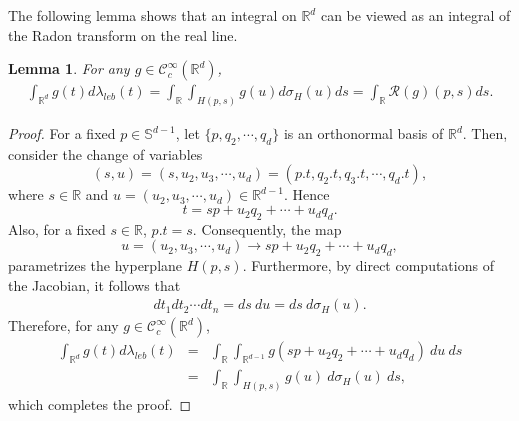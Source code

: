 \documentclass[11pt,reqno]{amsart}
\theoremstyle{plain}
\newtheorem{lemma}[theorem]{Lemma}
\theoremstyle{definition}
\numberwithin{equation}{section}
\newcommand{\R}{\mathbb{R}}
\newcommand{\beas}{\begin{eqnarray*}}
\newcommand{\eeas}{\end{eqnarray*}}
\begin{document}
     The following lemma shows that an integral on $\R^d$ can be viewed as an integral of the Radon transform on the real line.
	\begin{lemma}\label{le:COV}For any $g\in\mathcal C^\infty_c(\R^d)$,
		\beas\label{eq:cov cone}\nonumber
		\int_{\R^d} g(t) d\lambda_{leb}(t)= \int_\R \int_{H(p,s)} g(u) d\sigma_H(u) ds
		=\label{eq:cov cone} \int_\R \mathcal R (g)(p,s) ds.
		\eeas
	\end{lemma}
	\begin{proof}
		For a fixed $p\in\mathbb S^{d-1}$, let $\{p,q_2,\cdots,q_{d}\}$ is an orthonormal basis of $\R^d$. Then, consider the change of variables 
        \[
       (s,u)= (s,u_2,u_3,\cdots,u_{d})=( p.t,  q_2.t, q_3.t,\cdots, q_d.t),       
        \]
       where $s\in\R$ and $u=(u_2,u_3,\cdots,u_{d})\in\R^{d-1}$.
       Hence $$t= sp+u_2q_2+\cdots+u_dq_d.$$
       Also, for a fixed $s\in\R$, $ p.t=s$. Consequently, the map 
       \[
       u=(u_2,u_3,\cdots,u_{d})\rightarrow sp+u_2q_2+\cdots+u_dq_d, 
       \]
       parametrizes the hyperplane $H(p,s)$. Furthermore, by direct computations of the Jacobian, it follows that
       \beas
       dt_1 dt_2\cdots dt_n = ds \ du
       = ds \ d\sigma_H(u).
       \eeas
       Therefore, for any $g\in\mathcal C^{\infty}_c(\R^d)$,
       \beas
       \int_{\R^d} g(t) d\lambda_{leb}(t)&=&\int_\R \int_{\R^{d-1}} g(sp+u_2q_2+\cdots+u_dq_d) \ du \ ds
       \\&=&\int_\R \int_{H(p,s)} g(u)  \ d\sigma_H(u) \ ds,
       \eeas
       which completes the proof.
	\end{proof}
\end{document}

